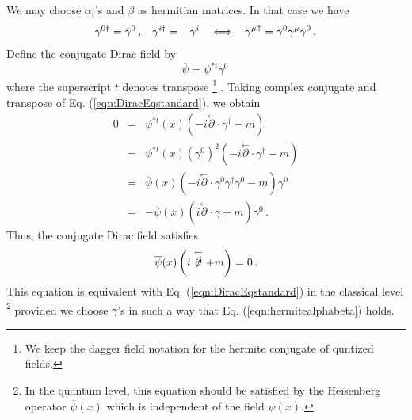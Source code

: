 We may choose $\alpha_i$'s and $\beta$ as hermitian matrices.
In that case we have
\begin{eqnarray}
\gamma^{0\dagger} = \gamma^0\,,
\hspace{3mm}
\gamma^{i\dagger} = - \gamma^i
\hspace{3mm}
\Longleftrightarrow
\hspace{3mm}
{\gamma^\mu}^\dagger = \gamma^0 \gamma^\mu \gamma^0 \,.
\label{eqn:hermitealphabeta}
\end{eqnarray}
Define the conjugate Dirac field by
\begin{equation}
\overline{\psi} = \psi^{*t} \gamma^0\,
\label{eqn:DefConjDiracField}
\end{equation}
where the superscript $t$ denotes transpose
\footnote{%
We keep the dagger field notation
for the hermite conjugate of quntized fields.
}%
.
Taking complex conjugate and transpose of Eq. (\ref{eqn:DiracEqstandard}), we obtain
\begin{eqnarray}
0 &=&  
\psi^{*t}(x) 
\left( -i \stackrel{\leftarrow}{\partial} \cdot \gamma^\dagger - m \right) 
\nonumber\\
&=&
\psi^{*t}(x) (\gamma^0)^2
\left( -i \stackrel{\leftarrow}{\partial} \cdot \gamma^\dagger - m \right) 
\nonumber\\
&=&
\overline{\psi}(x)
\left( -i \stackrel{\leftarrow}{\partial} \cdot \gamma^0\gamma^\dagger \gamma^0 - m \right) \gamma^0
\nonumber\\
&=&
- \overline{\psi}(x)
\left( i \stackrel{\leftarrow}{\partial} \cdot \gamma  + m \right) \gamma^0 \,.
\nonumber
\end{eqnarray}
Thus, the conjugate Dirac field satisfies
\begin{eqnarray}
\overline{\psi}(x)
\left( i \stackrel{\leftarrow}{\slashed{\partial}}  + m \right)
= 0 \,.
\label{eqn:DiracEqBarstandard}
\end{eqnarray}
This equation is equivalent with Eq. (\ref{eqn:DiracEqstandard}) in the classical level
\footnote{%
In the quantum level, this equation should be satisfied by the Heisenberg operator 
$\overline{\psi}(x)$ which is independent of the field ${\psi}(x)$.
}%
provided we choose $\gamma$'s in such a way that Eq. (\ref{eqn:hermitealphabeta}) holds.

\bigskip
